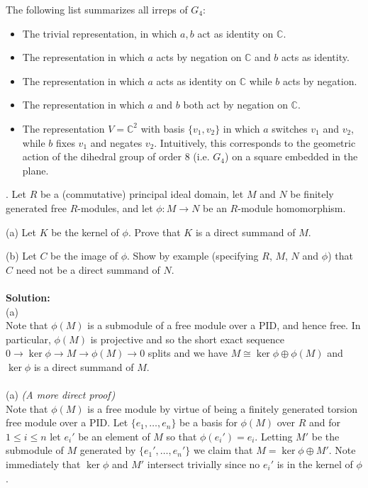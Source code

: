 \documentclass[11pt]{article}
\newcommand{\C}{\mathbb{C}}
\begin{document}
The following list summarizes all irreps of $G_4$:\begin{itemize}
\item The trivial representation, in which $a,b$ act as identity on $\C$.
\item The representation in which $a$ acts by negation on $\C$ and $b$ acts as identity.
\item The representation in which $a$ acts as identity on $\C$ while $b$ acts by negation.
\item The representation in which $a$ and $b$ both act by negation on $\C$.
\item The representation $V = \C^2$ with basis $\{v_1,v_2\}$ in which $a$ switches $v_1$ and $v_2$, while $b$ fixes $v_1$ and negates $v_2$. Intuitively, this corresponds to the geometric action of the dihedral group of order 8 (i.e. $G_4$) on a square embedded in the plane. 
\end{itemize}
. Let $R$ be a (commutative) principal ideal domain, let $M$ and $N$ be finitely generated free $R$-modules,
and let $\phi : M \to N$ be an $R$-module homomorphism.

(a) Let $K$ be the kernel of $\phi$. Prove that $K$ is a direct summand of $M$.

(b) Let $C$ be the image of $\phi$. Show by example (specifying $R$, $M$, $N$ and $\phi$) that $C$ need not be a direct summand of $N$.\\\\
\textbf{Solution:}\\
(a)\\
Note that $\phi(M)$ is a submodule of a free module over a PID, and hence free. In particular, $\phi(M)$ is projective and so the short exact sequence $0\to \ker\phi\to M\to \phi(M) \to 0$ splits and we have $M \cong \ker \phi \oplus \phi(M)$ and $\ker \phi$ is a direct summand of $M$. \\\\
(a) \emph{(A more direct proof)}\\
Note that $\phi(M)$ is a free module by virtue of being a finitely generated torsion free module over a PID. Let $\{e_1,\ldots, e_n\}$ be a basis for $\phi(M)$ over $R$ and for $1\le i \le n$ let $e_i'$ be an element of $M$ so that $\phi(e_i') = e_i$. Letting $M'$ be the submodule of $M$ generated by $\{e_1',\ldots, e_n'\}$ we claim that $M = \ker \phi \oplus M'$. Note immediately that $\ker \phi$ and $M'$ intersect trivially since no $e_i'$ is in the kernel of $\phi$. 
\end{document}
